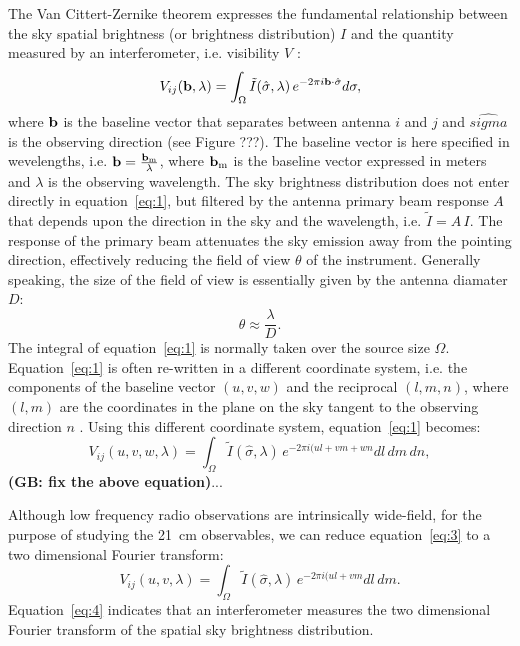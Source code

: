The Van Cittert-Zernike theorem expresses the fundamental relationship between the sky spatial brightness (or brightness distribution) $I$ and the quantity measured by an interferometer, i.e. visibility $V$ \citep{TMS}:
\begin{equation}
V_{ij} ({\bf b}, \lambda) = \int_\Omega {\tilde I} (\hat{\sigma}, \lambda) \, e^{-2 \pi i {\bf b} \cdot {\hat \sigma}} d {\bf \sigma},
\label{eq:1}
\end{equation}
where ${\bf b}$ is the baseline vector that separates between antenna $i$ and $j$ and $\hat{sigma}$ is the observing direction (see Figure ???). The baseline vector is here specified in wevelengths, i.e. ${\bf b} = \frac{{\bf b_{\rm m}}}{\lambda}$, where ${\bf b_{\rm m}}$ is the baseline vector expressed in meters and $\lambda$ is the observing wavelength.
The sky brightness distribution does not enter directly in equation~\ref{eq:1}, but filtered by the antenna primary beam response $A$ that depends upon the direction in the sky and the wavelength, i.e. ${\tilde I} = A  \, I$. The response of the primary beam attenuates the sky emission away from the pointing direction, effectively reducing the field of view $\theta$ of the instrument. Generally speaking, the size of the field of view is essentially given by the antenna diamater $D$: 
\begin{equation}
\theta \approx \frac{\lambda}{D}.
\label{eq:2}
\end{equation}
The integral of equation~\ref{eq:1} is normally taken over the source size $\Omega$. Equation~\ref{eq:1} is often re-written in a different coordinate system, i.e. the components of the baseline vector $(u,v,w)$ and the reciprocal $(l,m,n)$, where $(l,m)$ are the coordinates in the plane on the sky tangent to the observing direction $n$ \citep[for further details on coordinate systems see][]{TMS}. Using this different coordinate system, equation~\ref{eq:1} becomes:
\begin{equation}
V_{ij} (u,v,w, \lambda) = \int_\Omega {\tilde I} (\hat{\sigma}, \lambda) \, e^{-2 \pi i (ul + vm + wn} dl \, dm \, dn,
\label{eq:3}
\end{equation}
{\bf (GB: fix the above equation)}...

Although low frequency radio observations are intrinsically wide-field, for the purpose of studying the 21~cm observables, we can reduce equation~\ref{eq:3} to a two dimensional Fourier transform:
\begin{equation}
V_{ij} (u,v, \lambda) = \int_\Omega {\tilde I} (\hat{\sigma}, \lambda) \, e^{-2 \pi i (ul + vm} dl \, dm.
\label{eq:4}
\end{equation}
Equation~\ref{eq:4} indicates that an interferometer measures the two dimensional Fourier transform of the spatial sky brightness distribution.



